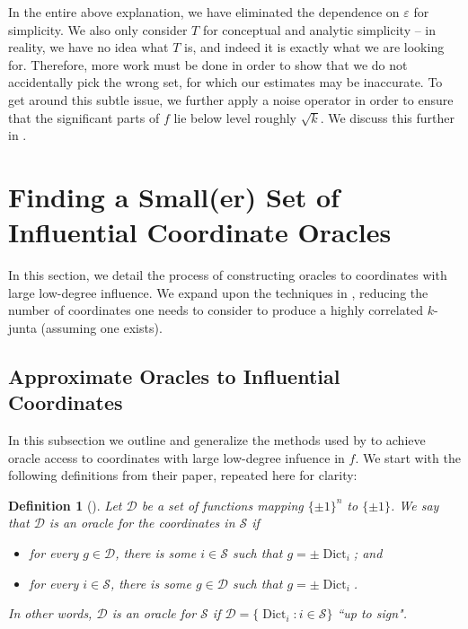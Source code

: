 \documentclass[10pt,a4paper]{article}
\theoremstyle{plain}
\newtheorem{definition}[theorem]{Definition}
\theoremstyle{remark}
\theoremstyle{plain}
\newcommand{\calS}{\mathcal{S}}
\newcommand{\Dict}{\operatorname{Dict}}
\newcommand{\InfluentialCoords}{\calS}
\newcommand{\InfluentialOracles}{\mathcal{D}}
\newcommand{\specialset}{T}
\renewcommand{\epsilon}{\varepsilon}
\begin{document}
In the entire above explanation, we have eliminated the dependence on $\epsilon$ for simplicity. We also only consider $\specialset$ for conceptual and analytic simplicity -- in reality, we have no idea what $\specialset$ is, and indeed it is exactly what we are looking for. Therefore, more work must be done in order to show that we do not accidentally pick the wrong set, for which our estimates may be inaccurate. To get around this subtle issue, we further apply a noise operator in order to ensure that the significant parts of $f$ lie below level roughly $\sqrt{k}$. We discuss this further in .




\section{Finding a Small(er) Set of  Influential Coordinate Oracles}
\label{section:improving-dmn}
In this section, we detail the process of constructing oracles to coordinates with large low-degree influence. We expand upon the techniques in \cite{junta-coordinate-oracles}, reducing the number of coordinates one needs to consider to produce a highly correlated $k$-junta (assuming one exists). 
\subsection{Approximate Oracles to Influential Coordinates}
\label{subsection:approx-oracles}
In this subsection we outline and generalize the methods used by \cite{junta-coordinate-oracles} to achieve oracle access to coordinates with large low-degree infuence in $f$. We start with the following definitions from their paper, repeated here for clarity:

\begin{definition}[]
Let $\InfluentialOracles$ be a set of functions mapping $\{ \pm 1\}^n$ to $\{ \pm 1\}$. We say that $\InfluentialOracles$ is an oracle for the coordinates in $\InfluentialCoords$ if 
\begin{itemize}
    \item for every $g \in \InfluentialOracles$, there is some $i \in \InfluentialCoords$ such that $g = \pm \Dict_i$; and
    \item for every $i \in \InfluentialCoords$, there is some $g \in \InfluentialOracles$ such that $g = \pm \Dict_i$.
\end{itemize}
In other words, $\InfluentialOracles$ is an oracle for $\InfluentialCoords$ if $\InfluentialOracles = \{ \Dict_i : i \in \InfluentialCoords\}$ ``up to sign".
\end{definition}
\end{document}
